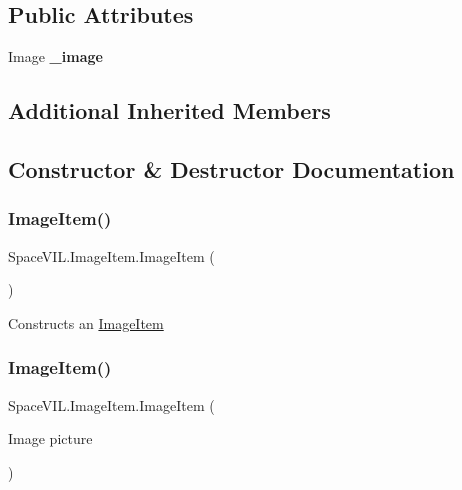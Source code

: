 \subsection*{Public Attributes}
\begin{DoxyCompactItemize}
\item 
\mbox{\label{class_space_v_i_l_1_1_image_item_aaecac14f8ec98844d7b642dd13073e5d}} 
Image {\bfseries \+\_\+image}
\end{DoxyCompactItemize}
\subsection*{Additional Inherited Members}


\subsection{Constructor \& Destructor Documentation}
\mbox{\label{class_space_v_i_l_1_1_image_item_afa5bd43ca4b8994abc75f357d74fb789}} 
\subsubsection{\texorpdfstring{Image\+Item()}{ImageItem()}\hspace{0.1cm}{\footnotesize\ttfamily [1/2]}}
{\footnotesize\ttfamily Space\+V\+I\+L.\+Image\+Item.\+Image\+Item (\begin{DoxyParamCaption}{ }\end{DoxyParamCaption})}



Constructs an \mbox{\hyperlink{class_space_v_i_l_1_1_image_item}{Image\+Item}} 

\mbox{\label{class_space_v_i_l_1_1_image_item_abdb9336a73b8d73c87263d65a8531276}} 
\subsubsection{\texorpdfstring{Image\+Item()}{ImageItem()}\hspace{0.1cm}{\footnotesize\ttfamily [2/2]}}
{\footnotesize\ttfamily Space\+V\+I\+L.\+Image\+Item.\+Image\+Item (\begin{DoxyParamCaption}\item[{Image}]{picture }\end{DoxyParamCaption})}



